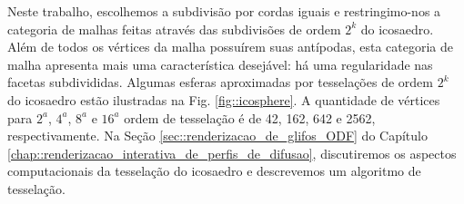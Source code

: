 \documentclass[
    12pt,                %
    oneside,            %
    a4paper,            %
    english,            %
    french,                %
    spanish,            %
    brazil                %
    ]{abntex2}
\begin{document}


Neste trabalho, escolhemos a subdivisão por cordas iguais e restringimo-nos a categoria de malhas feitas através das subdivisões de ordem $2^k$ do icosaedro. Além de todos os vértices da malha possuírem suas antípodas, esta categoria de malha apresenta mais uma característica desejável: há uma regularidade nas facetas subdivididas. Algumas esferas aproximadas por tesselações de ordem $2^k$ do icosaedro estão ilustradas na Fig. \ref{fig::icosphere}. A quantidade de vértices para $2^a$, $4^a$, $8^a$ e $16^a$ ordem de tesselação é de 42, 162, 642 e 2562, respectivamente. Na Seção \ref{sec::renderizacao_de_glifos_ODF} do Capítulo \ref{chap::renderizacao_interativa_de_perfis_de_difusao}, discutiremos os aspectos computacionais da tesselação do icosaedro e descrevemos um algoritmo de tesselação.
\end{document}
